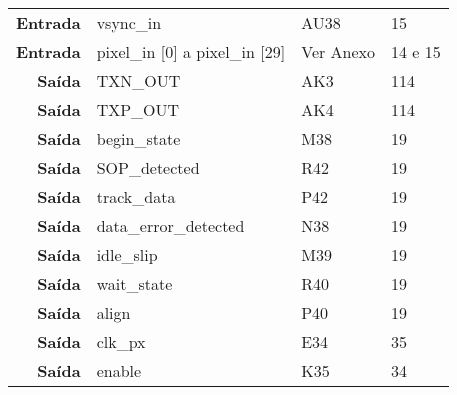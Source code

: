 \begin{table}[h!]
\begin{tabular}{rlll}
		\multicolumn{1}{r|}{\textbf{Entrada}} & vsync\_in                              & AU38                                     & 15                                         \\
		\multicolumn{1}{r|}{\textbf{Entrada}} & pixel\_in {[}0{]} a pixel\_in {[}29{]} & Ver Anexo                                & 14 e 15                                    \\
		\multicolumn{1}{r|}{\textbf{Saída}}   & TXN\_OUT                               & AK3                                      & 114                                        \\
		\multicolumn{1}{r|}{\textbf{Saída}}   & TXP\_OUT                               & AK4                                      & 114                                        \\
		\multicolumn{1}{r|}{\textbf{Saída}}   & begin\_state                           & M38                                      & 19                                         \\
		\multicolumn{1}{r|}{\textbf{Saída}}   & SOP\_detected                          & R42                                      & 19                                         \\
		\multicolumn{1}{r|}{\textbf{Saída}}   & track\_data                            & P42                                      & 19                                         \\
		\multicolumn{1}{r|}{\textbf{Saída}}   & data\_error\_detected                  & N38                                      & 19                                         \\
		\multicolumn{1}{r|}{\textbf{Saída}}   & idle\_slip                             & M39                                      & 19                                         \\
		\multicolumn{1}{r|}{\textbf{Saída}}   & wait\_state                            & R40                                      & 19                                         \\
		\multicolumn{1}{r|}{\textbf{Saída}}   & align                                  & P40                                      & 19                                         \\
		\multicolumn{1}{r|}{\textbf{Saída}}   & clk\_px                                & E34                                      & 35                                         \\
		\multicolumn{1}{r|}{\textbf{Saída}}   & enable                                 & K35                                      & 34                                         \\

\end{tabular}
\end{table}

